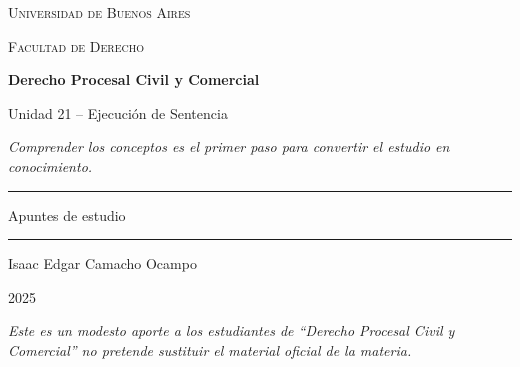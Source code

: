 \documentclass[12pt,oneside]{book}
\newcommand{\universidad}{Universidad de Buenos Aires}
\newcommand{\facultad}{Facultad de Derecho}
\newcommand{\materia}{Derecho Procesal Civil y Comercial}
\newcommand{\titulo}{Unidad 21 -- Ejecuci\'on de Sentencia}
\newcommand{\autor}{Isaac Edgar Camacho Ocampo}
\newcommand{\anio}{2025}
\begin{document}
\begin{titlepage}

\thispagestyle{empty}

\begin{center}

\vspace*{1cm}

{\large \textsc{\universidad}}

\vspace{0.2cm}

{\large \textsc{\facultad}}

\vspace{3cm}

{\Huge \textbf{\materia}}

\vspace{1cm}

{\LARGE \titulo}

\vspace{0.8cm}

\textit{Comprender los conceptos es el primer paso para convertir el estudio en conocimiento.}

\vspace{1.2cm}

\rule{0.70\textwidth}{0.5pt}

\vspace{0.5cm}

{\large Apuntes de estudio}

\vspace{0.5cm}

\rule{0.70\textwidth}{0.5pt}

\vfill

{\large \autor}

\vspace{0.3cm}

{\large \anio}

\end{center}

\vfill

\begin{flushleft}
\textit{Este es un modesto aporte a los estudiantes de ``Derecho Procesal Civil y Comercial'' no pretende sustituir el material oficial de la materia.}
\end{flushleft}

\end{titlepage}

\tableofcontents
\end{document}
